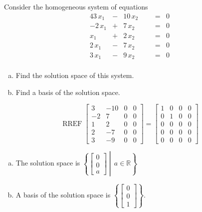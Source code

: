 
\begin{exerciseStatement}


Consider the homogeneous system of equations 
\begin{alignat*}{4} 3 \, x_{1} &-& 10 \, x_{2} & &  &=& 0 \\-2 \, x_{1} &+& 7 \, x_{2} & &  &=& 0 \\x_{1} &+& 2 \, x_{2} & &  &=& 0 \\2 \, x_{1} &-& 7 \, x_{2} & &  &=& 0 \\3 \, x_{1} &-& 9 \, x_{2} & &  &=& 0 \\ \end{alignat*}
            


\begin{enumerate}[(a)]
\item  Find the solution space of this system.
\item  Find a basis of the solution space.
\end{enumerate}
    
\end{exerciseStatement}
    
\begin{exerciseAnswer} 


\[\operatorname{RREF} \left[\begin{array}{ccc|c}
3 & -10 & 0 & 0 \\
-2 & 7 & 0 & 0 \\
1 & 2 & 0 & 0 \\
2 & -7 & 0 & 0 \\
3 & -9 & 0 & 0
\end{array}\right] = \left[\begin{array}{ccc|c}
1 & 0 & 0 & 0 \\
0 & 1 & 0 & 0 \\
0 & 0 & 0 & 0 \\
0 & 0 & 0 & 0 \\
0 & 0 & 0 & 0
\end{array}\right] \]


\begin{enumerate}[(a)]
\item The solution space is \( \left\{ \left[\begin{array}{c}
0 \\
0 \\
a
\end{array}\right] \middle|\,a\in\mathbb{R}\right\} \)
\item A basis of the solution space is \( \left\{ \left[\begin{array}{c}
0 \\
0 \\
1
\end{array}\right] \right\} \).
\end{enumerate}
    
\end{exerciseAnswer}
    
